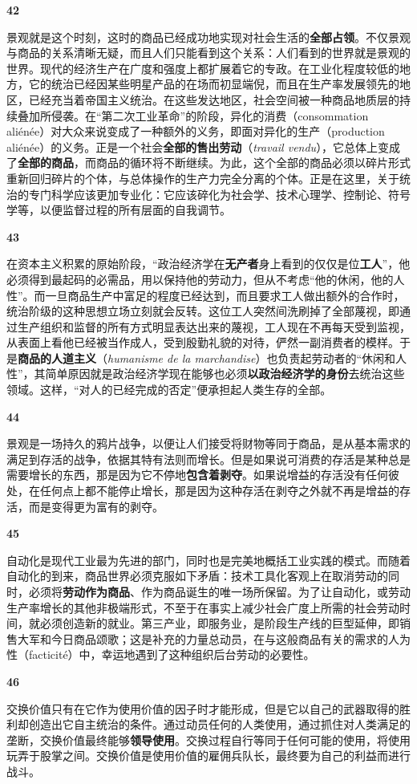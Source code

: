 \documentclass[fontset=fandol, a4paper, 12pt, openright]{ctexbook}
\makeatletter
\newcommand{\thesis}[1]{%
    \par\vspace{1.5em}%
    {\centering \textbf{\Large #1}\par}%
    \nobreak\vspace{0.5em}\nobreak
    \@afterindenttrue %
    \@afterheading    %
}
\makeatother
\begin{document}
\thesis{42}
景观就是这个时刻，这时的商品已经成功地实现对社会生活的\textbf{全部占领}。不仅景观与商品的关系清晰无疑，而且人们只能看到这个关系：人们看到的世界就是景观的世界。现代的经济生产在广度和强度上都扩展着它的专政。在工业化程度较低的地方，它的统治已经因某些明星产品的在场而初显端倪，而且在生产率发展领先的地区，已经充当着帝国主义统治。在这些发达地区，社会空间被一种商品地质层的持续叠加所侵袭。在“第二次工业革命”的阶段，异化的消费（consommation aliénée）对大众来说变成了一种额外的义务，即面对异化的生产（production aliénée）的义务。正是一个社会\textbf{全部的售出劳动}（\textit{travail vendu}），它总体上变成了\textbf{全部的商品}，而商品的循环将不断继续。为此，这个全部的商品必须以碎片形式重新回归碎片的个体，与总体操作的生产力完全分离的个体。正是在这里，关于统治的专门科学应该更加专业化：它应该碎化为社会学、技术心理学、控制论、符号学等，以便监督过程的所有层面的自我调节。

\thesis{43}
在资本主义积累的原始阶段，“政治经济学在\textbf{无产者}身上看到的仅仅是位\textbf{工人}”，他必须得到最起码的必需品，用以保持他的劳动力，但从不考虑“他的休闲，他的人性”。而一旦商品生产中富足的程度已经达到，而且要求工人做出额外的合作时，统治阶级的这种思想立场立刻就会反转。这位工人突然间洗刷掉了全部蔑视，即通过生产组织和监督的所有方式明显表达出来的蔑视，工人现在不再每天受到监视，从表面上看他已经被当作成人，受到殷勤礼貌的对待，俨然一副消费者的模样。于是\textbf{商品的人道主义}（\textit{humanisme de la marchandise}）也负责起劳动者的“休闲和人性”，其简单原因就是政治经济学现在能够也必须\textbf{以政治经济学的身份}去统治这些领域。这样，“对人的已经完成的否定”便承担起人类生存的全部。

\thesis{44}
景观是一场持久的鸦片战争，以便让人们接受将财物等同于商品，是从基本需求的满足到存活的战争，依据其特有法则而增长。但是如果说可消费的存活是某种总是需要增长的东西，那是因为它不停地\textbf{包含着剥夺}。如果说增益的存活没有任何彼处，在任何点上都不能停止增长，那是因为这种存活在剥夺之外就不再是增益的存活，而是变得更为富有的剥夺。

\thesis{45}
自动化是现代工业最为先进的部门，同时也是完美地概括工业实践的模式。而随着自动化的到来，商品世界必须克服如下矛盾：技术工具化客观上在取消劳动的同时，必须将\textbf{劳动作为商品}、作为商品诞生的唯一场所保留。为了让自动化，或劳动生产率增长的其他非极端形式，不至于在事实上减少社会广度上所需的社会劳动时间，就必须创造新的就业。第三产业，即服务业，是阶段生产线的巨型延伸，即销售大军和今日商品颂歌；这是补充的力量总动员，在与这般商品有关的需求的人为性（facticité）中，幸运地遇到了这种组织后台劳动的必要性。

\thesis{46}
交换价值只有在它作为使用价值的因子时才能形成，但是它以自己的武器取得的胜利却创造出它自主统治的条件。通过动员任何的人类使用，通过抓住对人类满足的垄断，交换价值最终能够\textbf{领导使用}。交换过程自行等同于任何可能的使用，将使用玩弄于股掌之间。交换价值是使用价值的雇佣兵队长，最终要为自己的利益而进行战斗。
\end{document}
